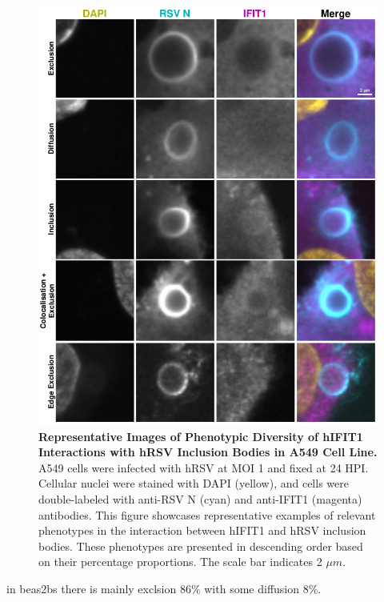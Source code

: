\begin{figure}
    \centering
    \includegraphics[width=1\linewidth]{08. Chapter 3/Figs/02. Infection/01. IFIT1/03. a549 i1.pdf}
    \caption[Representative Images of Phenotypic Diversity of hIFIT1 Interactions with hRSV Inclusion Bodies in A549 Cell Line.]{\textbf{Representative Images of Phenotypic Diversity of hIFIT1 Interactions with hRSV Inclusion Bodies in A549 Cell Line.} A549 cells were infected with hRSV at MOI 1 and fixed at 24 HPI. Cellular nuclei were stained with DAPI (yellow), and cells were double-labeled with anti-RSV N (cyan) and anti-IFIT1 (magenta) antibodies. This figure showcases representative examples of relevant phenotypes in the interaction between hIFIT1 and hRSV inclusion bodies. These phenotypes are presented in descending order based on their percentage proportions. The scale bar indicates 2 \(\mu m\).}
    \label{fig:Representative Images of Phenotypic Diversity of hIFIT1 Interactions with hRSV Inclusion Bodies in A549 Cell Line}
\end{figure}

in beas2bs there is mainly exclsion 86\% with some diffusion 8\%.

